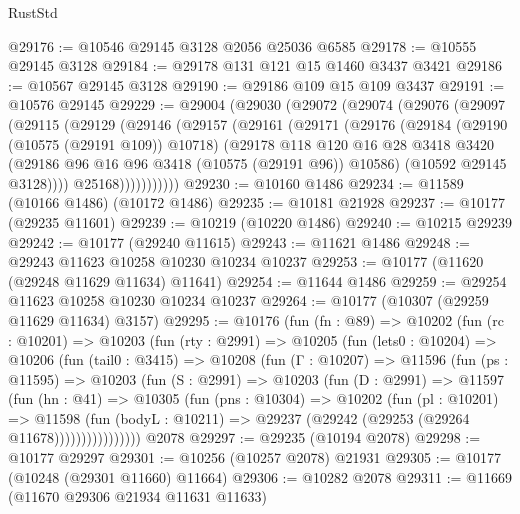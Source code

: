 \begin{lexlean}{RustStd}
\begin{coremodule}
@29176 := @10546 @29145 @3128 @2056 @25036 @6585
@29178 := @10555 @29145 @3128
@29184 := @29178 @131 @121 @15 @1460 @3437 @3421
@29186 := @10567 @29145 @3128
@29190 := @29186 @109 @15 @109 @3437
@29191 := @10576 @29145
@29229 := @29004
    (@29030
      (@29072
        (@29074
          (@29076
            (@29097
              (@29115
                (@29129
                  (@29146
                    (@29157
                      (@29161
                        (@29171
                          (@29176
                            (@29184
                              (@29190 (@10575 (@29191 @109)) @10718)
                              (@29178
                                @118
                                @120
                                @16
                                @28
                                @3418
                                @3420
                                (@29186 @96 @16 @96 @3418 (@10575 (@29191 @96)) @10586)
                                (@10592 @29145 @3128))))
                          @25168)))))))))))
@29230 := @10160 @1486
@29234 := @11589 (@10166 @1486) (@10172 @1486)
@29235 := @10181 @21928
@29237 := @10177 (@29235 @11601)
@29239 := @10219 (@10220 @1486)
@29240 := @10215 @29239
@29242 := @10177 (@29240 @11615)
@29243 := @11621 @1486
@29248 := @29243 @11623 @10258 @10230 @10234 @10237
@29253 := @10177 (@11620 (@29248 @11629 @11634) @11641)
@29254 := @11644 @1486
@29259 := @29254 @11623 @10258 @10230 @10234 @10237
@29264 := @10177 (@10307 (@29259 @11629 @11634) @3157)
@29295 := @10176
    (fun (fn : @89) =>
    @10202
      (fun (rc : @10201) =>
      @10203
        (fun (rty : @2991) =>
        @10205
          (fun (lets0 : @10204) =>
          @10206
            (fun (tail0 : @3415) =>
            @10208
              (fun (Γ : @10207) =>
              @11596
                (fun (ps : @11595) =>
                @10203
                  (fun (S : @2991) =>
                  @10203
                    (fun (D : @2991) =>
                    @11597
                      (fun (hn : @41) =>
                      @10305
                        (fun (pns : @10304) =>
                        @10202
                          (fun (pl : @10201) =>
                          @11598
                            (fun (bodyL : @10211) =>
                            @29237 (@29242 (@29253 (@29264 @11678))))))))))))))))
    @2078
@29297 := @29235 (@10194 @2078)
@29298 := @10177 @29297
@29301 := @10256 (@10257 @2078) @21931
@29305 := @10177 (@10248 (@29301 @11660) @11664)
@29306 := @10282 @2078
@29311 := @11669 (@11670 @29306 @21934 @11631 @11633)

\end{coremodule}
\end{lexlean}
